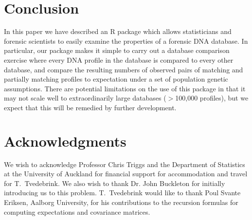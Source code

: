 \documentclass[a4paper,11pt]{article}
\newcommand{\proglang}[1]{\textsf{#1}}
\begin{document}
\section[Conclusion]{Conclusion}
In this paper we have described an \proglang{R} package which allows
statisticians and forensic scientists to easily examine the properties
of a forensic DNA database. In particular, our package makes it simple
to carry out a database comparison exercise where every DNA profile in
the database is compared to every other database, and compare the
resulting numbers of observed pairs of matching and partially matching
profiles to expectation under a set of population genetic
assumptions. There are potential limitations on the use of this
package in that it may not scale well to extraordinarily large
databases ($>$100,000 profiles), but we expect that this will be
remedied by further development.

\section*{Acknowledgments}
We wish to acknowledge Professor Chris Triggs and the Department of
Statistics at the University of Auckland for financial support for
accommodation and travel for T.~Tvedebrink. We also wish to thank
Dr. John Buckleton for initially introducing us to this problem.
T.~Tvedebrink would like to thank Poul Svante Eriksen, Aalborg
University, for his contributions to the recursion formulas for
computing expectations and covariance matrices. 


\end{document}
